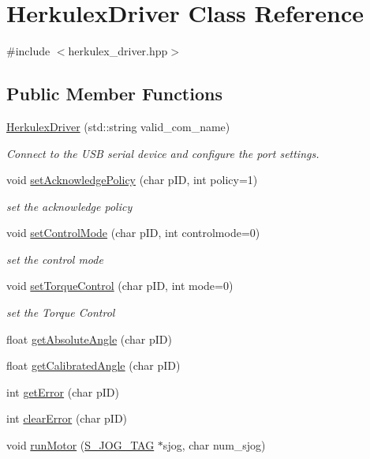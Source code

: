 \hypertarget{class_herkulex_driver}{}\section{Herkulex\+Driver Class Reference}
\label{class_herkulex_driver}


{\ttfamily \#include $<$herkulex\+\_\+driver.\+hpp$>$}

\subsection*{Public Member Functions}
\begin{DoxyCompactItemize}
\item 
\mbox{\hyperlink{class_herkulex_driver_a7c08f5e017f2d907b252b2c93bcfc6a8}{Herkulex\+Driver}} (std\+::string valid\+\_\+com\+\_\+name)
\begin{DoxyCompactList}\small\item\em Connect to the U\+SB serial device and configure the port settings. \end{DoxyCompactList}\item 
void \mbox{\hyperlink{class_herkulex_driver_a79b66b9bca4844244fb42eea57aa3e68}{set\+Acknowledge\+Policy}} (char p\+ID, int policy=1)
\begin{DoxyCompactList}\small\item\em set the acknowledge policy \end{DoxyCompactList}\item 
void \mbox{\hyperlink{class_herkulex_driver_adc46bbeb799bc4468423e42401f17006}{set\+Control\+Mode}} (char p\+ID, int controlmode=0)
\begin{DoxyCompactList}\small\item\em set the control mode \end{DoxyCompactList}\item 
void \mbox{\hyperlink{class_herkulex_driver_a2571e6165507ae6345c0bd1ad5671476}{set\+Torque\+Control}} (char p\+ID, int mode=0)
\begin{DoxyCompactList}\small\item\em set the Torque Control \end{DoxyCompactList}\item 
float \mbox{\hyperlink{class_herkulex_driver_ac27d17cba8bbaceb0a48215cea764c0b}{get\+Absolute\+Angle}} (char p\+ID)
\item 
float \mbox{\hyperlink{class_herkulex_driver_a22b2f9f17c0d74aae368149ec240d4a3}{get\+Calibrated\+Angle}} (char p\+ID)
\item 
int \mbox{\hyperlink{class_herkulex_driver_aaa8fe5f9dd0c08a0f669ca34d9f1b607}{get\+Error}} (char p\+ID)
\item 
int \mbox{\hyperlink{class_herkulex_driver_aeaf3b05814878c6c726bae1ef6a69a6f}{clear\+Error}} (char p\+ID)
\item 
void \mbox{\hyperlink{class_herkulex_driver_a88a5a3b6d55fb817034308a7282f386b}{run\+Motor}} (\mbox{\hyperlink{struct_s___j_o_g___t_a_g}{S\+\_\+\+J\+O\+G\+\_\+\+T\+AG}} $\ast$sjog, char num\+\_\+sjog)
\end{DoxyCompactItemize}
